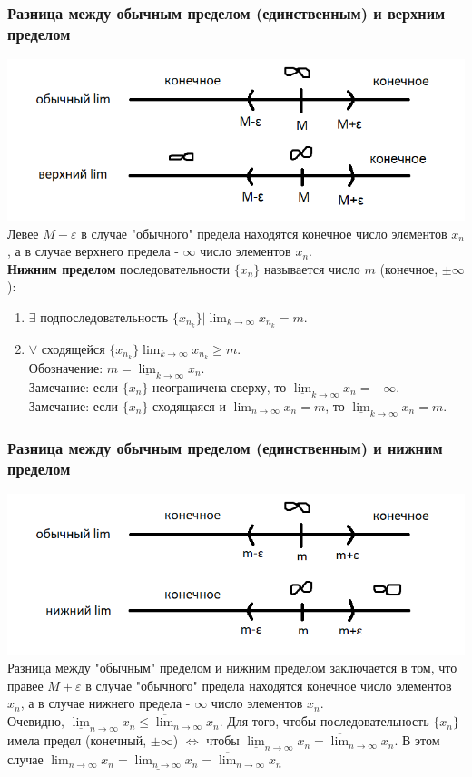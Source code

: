 \documentclass[12pt]{article}
\begin{document}
    \subsubsection*{Разница между обычным пределом (единственным) и верхним пределом}
    \includegraphics{2.9.1}\\
    Левее $M-\varepsilon$ в случае "обычного" предела находятся конечное число элементов $x_n$, а в случае верхнего предела - $\infty$ число элементов $x_n$.\\
    \textbf{Нижним пределом} последовательности $\{x_n\}$ называется число $m$ (конечное, $\pm \infty$):
    \begin{enumerate}
        \item $\exists$ подпоследовательность $\{x_{n_{k}}\} \Big| \lim_{k\to\infty}x_{n_{k}} = m$.
        \item $\forall$ сходящейся $\{x_{n_{k}}\} \lim_{k\to\infty} x_{n_{k}} \ge m$.\\
        Обозначение: $m = \underline{\lim}_{k\to\infty}x_n$.\\
        Замечание: если $\{x_n\}$ неограничена сверху, то $\underline{\lim}_{k\to\infty}x_n = -\infty$.\\
        Замечание: если $\{x_n\}$ сходящаяся и $\lim_{n\to\infty} x_n = m$, то $\underline{\lim}_{k\to\infty}x_n = m$.
    \end{enumerate}
    \subsubsection*{Разница между обычным пределом (единственным) и нижним пределом}
    \includegraphics{2.9.2}\\
    Разница между "обычным" пределом и нижним пределом заключается в том, что правее $M+\varepsilon$ в случае "обычного" предела находятся конечное число элементов $x_n$, а в случае нижнего предела - $\infty$ число элементов $x_n$.\\
    Очевидно, $\underline{\lim}_{n\to\infty}x_n \le \overline{\lim}_{n\to\infty}x_n$.
    Для того, чтобы последовательность $\{x_n\}$ имела предел (конечный, $\pm \infty$) $\Leftrightarrow$ чтобы $\underline{\lim}_{n\to\infty} x_n = \overline{\lim}_{n\to\infty} x_n$. В этом случае $\lim_{n\to\infty} x_n = \underline{\lim_{n\to\infty}} x_n = \overline{\lim}_{n\to\infty} x_n$
    
\end{document}
